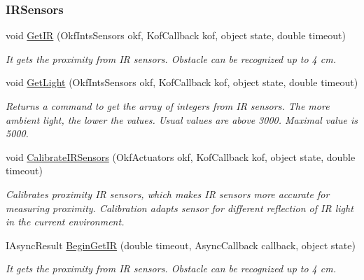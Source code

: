 \subsubsection*{IRSensors} %
\label{ssub:IRSensors}
  \begin{DoxyCompactItemize}

  \item  void \hyperlink{class_elib_1_1_epuck_a18153b3e43432af66a9baa973b77c5bd}{GetIR} (OkfIntsSensors okf, KofCallback kof, object state, double timeout)
  \begin{DoxyCompactList}\small\item\em It gets the proximity from IR sensors. Obstacle can be recognized up to 4 cm. \item\end{DoxyCompactList}

  \item   void \hyperlink{class_elib_1_1_epuck_a99130d9756d311379572f65411539888}{GetLight} (OkfIntsSensors okf, KofCallback kof, object state, double timeout)
  \begin{DoxyCompactList}\small\item\em Returns a command to get the array of integers from IR sensors. The more ambient light, the lower the values. Usual values are above 3000. Maximal value is 5000. \item\end{DoxyCompactList}

  \item void \hyperlink{class_elib_1_1_epuck_aa15c26b061ee31dfb343f546d89bd864}{CalibrateIRSensors} (OkfActuators okf, KofCallback kof, object state, double timeout)
  \begin{DoxyCompactList}\small\item\em Calibrates proximity IR sensors, which makes IR sensors more accurate for measuring proximity. Calibration adapts sensor for different reflection of IR light in the current environment. \item\end{DoxyCompactList}

  \item   IAsyncResult \hyperlink{class_elib_1_1_epuck_a66741b5d59b9bb5a26596b050741dee8}{BeginGetIR} (double timeout, AsyncCallback callback, object state)
  \begin{DoxyCompactList}\small\item\em It gets the proximity from IR sensors. Obstacle can be recognized up to 4 cm. \item\end{DoxyCompactList}


\end{DoxyCompactItemize}
